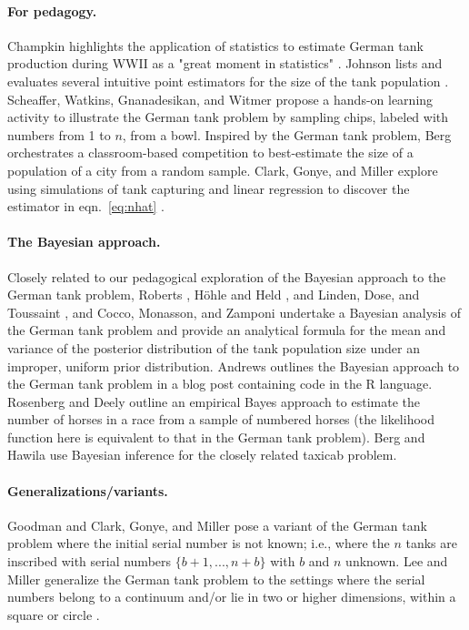 \documentclass[11pt, oneside]{article}
\begin{document}
\paragraph{For pedagogy.} Champkin highlights the application of statistics to estimate German tank production during WWII as a "great moment in statistics" \cite{grajalez2013great}. 
Johnson lists and evaluates several intuitive point estimators for the size of the tank population \cite{johnson1994estimating}. 
Scheaffer, Watkins, Gnanadesikan, and Witmer \cite{scheaffer2013activity} propose a hands-on learning activity to illustrate the German tank problem by sampling chips, labeled with numbers from 1 to $n$, from a bowl. 
Inspired by the German tank problem, Berg \cite{berg2021bayesian} orchestrates a classroom-based competition to best-estimate the size of a population of a city from a random sample. Clark, Gonye, and Miller explore using simulations of tank capturing and linear regression to discover the estimator in eqn.~\ref{eq:nhat} \cite{clark2021lessons}. 


\paragraph{The Bayesian approach.}
Closely related to our pedagogical exploration of the Bayesian approach to the German tank problem, Roberts \cite{roberts1967informative}, H{\"o}hle and Held \cite{hohle2006bayesian}, and Linden, Dose, and Toussaint \cite{von2014bayesian}, and Cocco, Monasson, and Zamponi \cite{cocco2022statistical} undertake a Bayesian analysis of the German tank problem and provide an analytical formula for the mean and variance of the posterior distribution of the tank population size under an improper, uniform prior distribution. Andrews \cite{blogpost} outlines the Bayesian approach to the German tank problem in a blog post containing code in the R language. 
Rosenberg and Deely \cite{rosenberg1976horse} outline an empirical Bayes approach to estimate the number of horses in a race from a sample of numbered horses (the likelihood function here is equivalent to that in the German tank problem). 
Berg and Hawila \cite{berg2021bayesian2} use Bayesian inference for the closely related taxicab problem. 

\paragraph{Generalizations/variants.}
Goodman \cite{goodman1952serial,goodman1954some} and Clark, Gonye, and Miller \cite{clark2021lessons} pose a variant of the German tank problem where the initial serial number is not known; i.e., where the $n$ tanks are inscribed with serial numbers $\{b+1, ..., n+b\}$ with $b$ and $n$ unknown. 
Lee and Miller generalize the German tank problem to the settings where the serial numbers belong to a continuum and/or lie in two or higher dimensions, within a square or circle \cite{lee2022generalizing}. 
\end{document}
